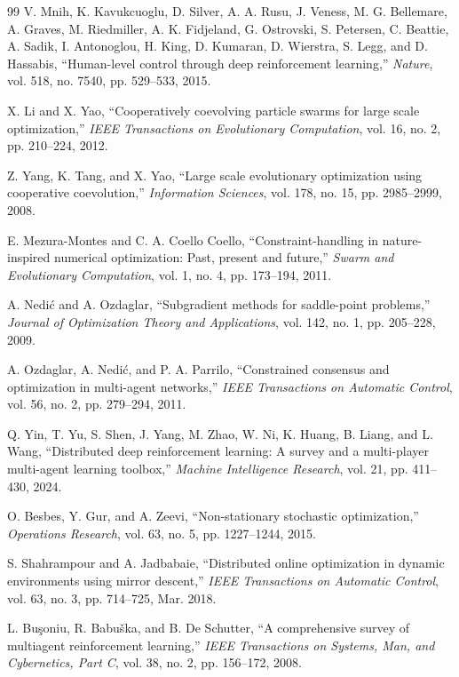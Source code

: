 \documentclass[conference]{IEEEtran}
\begin{document}
\begin{thebibliography}{99}
 V. Mnih, K. Kavukcuoglu, D. Silver, A. A. Rusu, J. Veness, M. G. Bellemare, A. Graves, M. Riedmiller, A. K. Fidjeland, G. Ostrovski, S. Petersen, C. Beattie, A. Sadik, I. Antonoglou, H. King, D. Kumaran, D. Wierstra, S. Legg, and D. Hassabis, ``Human-level control through deep reinforcement learning,'' \emph{Nature}, vol. 518, no. 7540, pp. 529--533, 2015.

 X. Li and X. Yao, ``Cooperatively coevolving particle swarms for large scale optimization,'' \emph{IEEE Transactions on Evolutionary Computation}, vol. 16, no. 2, pp. 210--224, 2012.

 Z. Yang, K. Tang, and X. Yao, ``Large scale evolutionary optimization using cooperative coevolution,'' \emph{Information Sciences}, vol. 178, no. 15, pp. 2985--2999, 2008.

 E. Mezura-Montes and C. A. Coello Coello, ``Constraint-handling in nature-inspired numerical optimization: Past, present and future,'' \emph{Swarm and Evolutionary Computation}, vol. 1, no. 4, pp. 173--194, 2011.

 A. Nedi\'c and A. Ozdaglar, ``Subgradient methods for saddle-point problems,'' \emph{Journal of Optimization Theory and Applications}, vol. 142, no. 1, pp. 205--228, 2009.

 A. Ozdaglar, A. Nedi\'c, and P. A. Parrilo, ``Constrained consensus and optimization in multi-agent networks,'' \emph{IEEE Transactions on Automatic Control}, vol. 56, no. 2, pp. 279--294, 2011.

 Q. Yin, T. Yu, S. Shen, J. Yang, M. Zhao, W. Ni, K. Huang, B. Liang, and L. Wang, ``Distributed deep reinforcement learning: A survey and a multi-player multi-agent learning toolbox,'' \emph{Machine Intelligence Research}, vol. 21, pp. 411--430, 2024.

 O. Besbes, Y. Gur, and A. Zeevi, ``Non-stationary stochastic optimization,'' \emph{Operations Research}, vol. 63, no. 5, pp. 1227--1244, 2015.

 S. Shahrampour and A. Jadbabaie, ``Distributed online optimization in dynamic environments using mirror descent,'' \emph{IEEE Transactions on Automatic Control}, vol. 63, no. 3, pp. 714--725, Mar. 2018.

 L. Bu\c{s}oniu, R. Babu\v{s}ka, and B. De Schutter, ``A comprehensive survey of multiagent reinforcement learning,'' \emph{IEEE Transactions on Systems, Man, and Cybernetics, Part C}, vol. 38, no. 2, pp. 156--172, 2008.


\end{thebibliography}
\end{document}
